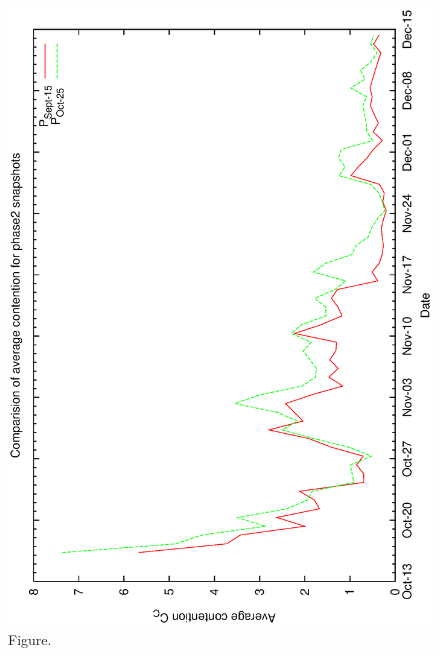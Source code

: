 \documentclass[12pt,a4paper]{article}
\begin{document}
\begin{figure}[htbp]
 \begin{center}
  \includegraphics[scale=1.0, angle=0]{figures/c60_odb_cav.eps}
 \end{center}
  \caption[Figure.]
{Figure.}
\end{figure}
\clearpage
\end{document}
